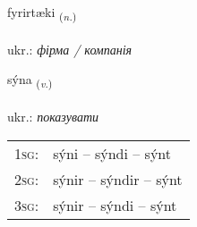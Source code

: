 \documentclass[frontgrid, backgrid]{flacards}\usepackage[]{graphicx}\usepackage[]{xcolor}
\begin{document}
\renewcommand{\flhead}{\vskip5pt \fboxsep=0pt {\small\bfseries\footnotesize Nafnorð | іменник}}
\renewcommand{\fcfoot}{\vskip5pt \fboxsep=0pt \hspace{2pt}{\small\bfseries\footnotesize 1K}}

\renewcommand{\blhead}{\vskip5pt {\small\bfseries\footnotesize Nafnorð | іменник }}
\renewcommand{\bcfoot}{\vskip5pt \hspace{2pt}{\small\bfseries\footnotesize 1K}}


{fyrirtæki \small{\textsubscript{(\textit{n.})}} \\[1ex] %
 \\
ukr.: \emph{фірма / компанія} \\  [2ex]
\renewcommand*{\arraystretch}{0.8}
}

\renewcommand{\flhead}{\vskip5pt \fboxsep=0pt {\small\bfseries\footnotesize Sagnorð | дієслово}}
\renewcommand{\fcfoot}{\vskip5pt \fboxsep=0pt \hspace{2pt}{\small\bfseries\footnotesize 1K}}

\renewcommand{\blhead}{\vskip5pt {\small\bfseries\footnotesize Sagnorð | дієслово }}
\renewcommand{\bcfoot}{\vskip5pt \hspace{2pt}{\small\bfseries\footnotesize 1K}}


{sýna \small{\textsubscript{(\textit{v.})}} \\[1ex] %
\textphonetic{[siːna]} \\
ukr.: \emph{показувати} \\  [2ex]
\renewcommand*{\arraystretch}{0.8}
\begin{tabular}{p{1cm}l}
\textsc{1sg}: & sýni -- sýndi -- sýnt \\ 
\textsc{2sg}: & sýnir -- sýndir -- sýnt \\ 
\textsc{3sg}: & sýnir -- sýndi -- sýnt \\ 
\end{tabular}
}
\end{document}
